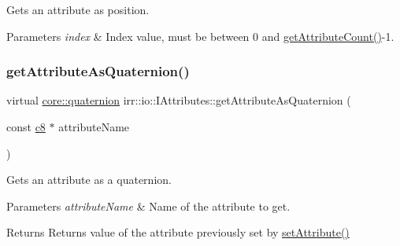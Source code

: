 Gets an attribute as position. 


\begin{DoxyParams}{Parameters}
{\em index} & Index value, must be between 0 and \hyperlink{classirr_1_1io_1_1IAttributes_a796bdd9440ee7ba0b6742a90a82870b6}{get\+Attribute\+Count()}-\/1. \\
\hline
\end{DoxyParams}
\mbox{\label{classirr_1_1io_1_1IAttributes_a59248466d3f3ea2d7930876e577b222d}} 
\subsubsection{\texorpdfstring{get\+Attribute\+As\+Quaternion()}{getAttributeAsQuaternion()}\hspace{0.1cm}{\footnotesize\ttfamily [1/2]}}
{\footnotesize\ttfamily virtual \hyperlink{classirr_1_1core_1_1quaternion}{core\+::quaternion} irr\+::io\+::\+I\+Attributes\+::get\+Attribute\+As\+Quaternion (\begin{DoxyParamCaption}\item[{const \hyperlink{namespaceirr_a9395eaea339bcb546b319e9c96bf7410}{c8} $\ast$}]{attribute\+Name }\end{DoxyParamCaption})\hspace{0.3cm}{\ttfamily [pure virtual]}}



Gets an attribute as a quaternion. 


\begin{DoxyParams}{Parameters}
{\em attribute\+Name} & Name of the attribute to get. \\
\hline
\end{DoxyParams}
\begin{DoxyReturn}{Returns}
Returns value of the attribute previously set by \hyperlink{classirr_1_1io_1_1IAttributes_a03fa31acb481ae23678676cc183f09a6}{set\+Attribute()} 
\end{DoxyReturn}
\mbox{\label{classirr_1_1io_1_1IAttributes_aee7cc16cae259af9cbdd37bfc9956a5f}} 
